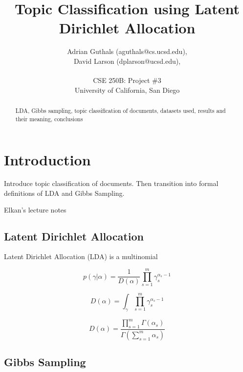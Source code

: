 \documentclass[10pt]{article}
\title{Topic Classification using Latent Dirichlet Allocation}
\author{Adrian Guthals (aguthals@cs.ucsd.edu),\\
David Larson (dplarson@ucsd.edu),\\
\\
CSE 250B: Project \#3 \\
University of California, San Diego \\
}
\begin{document}
\maketitle


\begin{abstract}
LDA, Gibbs sampling, topic classification of documents, datasets used, results and their meaning, conclusions
\end{abstract}



\section{Introduction}
\label{sec:intro}

Introduce topic classification of documents. Then transition into formal definitions of LDA and Gibbs Sampling.

Elkan's lecture notes \cite{CSE250B}


\subsection{Latent Dirichlet Allocation}
\label{sec:lda}

Latent Dirichlet Allocation (LDA) is a multinomial

\begin{equation}
    p(\gamma | \alpha) = \frac{1}{D(\alpha)} \prod_{s=1}^{m} \gamma_{s}^{\alpha_s - 1}
\end{equation}

\begin{equation}
    D(\alpha) = \int_{\gamma} \prod_{s=1}^m \gamma_s^{\alpha_s - 1}
\end{equation}

\begin{equation}
    D(\alpha) = \frac{\prod_{s=1}^m \Gamma(\alpha_s)}{\Gamma (\sum_{s=1}^m \alpha_s )}
\end{equation}



\subsection{Gibbs Sampling}
\label{sec:gibbs}
\end{document}
